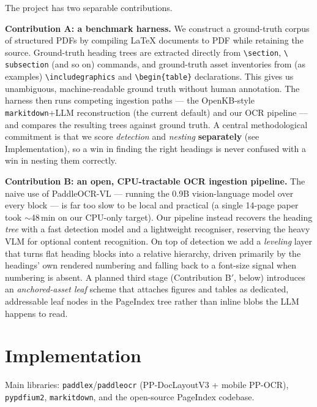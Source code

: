 \documentclass[11pt, a4paper]{article}
\begin{document}
The project has two separable contributions.

\textbf{Contribution A: a benchmark harness.} We construct a
ground-truth corpus of structured PDFs by compiling LaTeX documents to
PDF while retaining the source. Ground-truth heading trees are extracted
directly from \texttt{\textbackslash section}, \texttt{\textbackslash
subsection} (and so on) commands, and ground-truth asset inventories
from (as examples) \texttt{\textbackslash includegraphics} and
\texttt{\textbackslash begin\{table\}} declarations. This gives us
unambiguous, machine-readable ground truth without human annotation. The
harness then runs competing ingestion paths --- the OpenKB-style
\texttt{markitdown}+LLM reconstruction (the current default) and our OCR
pipeline --- and compares the resulting trees against ground truth. A
central methodological commitment is that we score \emph{detection} and
\emph{nesting} \textbf{separately} (see Implementation), so a win in
finding the right headings is never confused with a win in nesting them
correctly.

\textbf{Contribution B: an open, CPU-tractable OCR ingestion pipeline.}
The naive use of PaddleOCR-VL --- running the 0.9B vision-language model
over every block --- is far too slow to be local and practical (a single
14-page paper took $\sim$48\,min on our CPU-only target). Our pipeline
instead recovers the heading \emph{tree} with a fast detection model and
a lightweight recogniser, reserving the heavy VLM for optional content
recognition. On top of detection we add a \emph{leveling} layer that
turns flat heading blocks into a relative hierarchy, driven primarily by
the headings' own rendered numbering and falling back to a font-size
signal when numbering is absent. A planned third stage (Contribution
B$'$, below) introduces an \emph{anchored-asset leaf} scheme that
attaches figures and tables as dedicated, addressable leaf nodes in the
PageIndex tree rather than inline blobs the LLM happens to read.

\section*{Implementation}

Main libraries: \texttt{paddlex}/\texttt{paddleocr} (PP-DocLayoutV3 +
mobile PP-OCR), \texttt{pypdfium2}, \texttt{markitdown}, and the
open-source PageIndex codebase.
\end{document}
